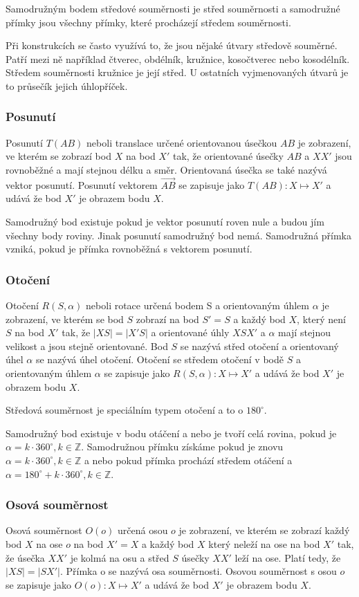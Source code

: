 \documentclass[12pt]{article}
\begin{document}
Samodružným bodem středové souměrnosti je střed souměrnosti a samodružné přímky jsou všechny
přímky, které procházejí středem souměrnosti.

Při konstrukcích se často využívá to, že jsou nějaké útvary středově souměrné. Patří mezi ně
například čtverec, obdélník, kružnice, kosočtverec nebo kosodélník. Středem souměrnosti kružnice je
její střed. U ostatních vyjmenovaných útvarů je to průsečík jejich úhlopříček.
\subsubsection*{Posunutí}
Posunutí $T(AB)$ neboli translace určené orientovanou úsečkou $AB$ je zobrazení, ve kterém se zobrazí
bod $X$ na bod $X'$ tak, že orientované úsečky $AB$ a $XX'$ jsou rovnoběžné a mají stejnou délku
a směr. Orientovaná úsečka se také nazývá vektor posunutí. Posunutí vektorem $\vec{AB}$ se zapisuje
jako $T(AB) : X \mapsto X'$ a udává že bod $X'$ je obrazem bodu $X$. 

Samodružný bod existuje pokud je vektor posunutí roven nule a budou jím všechny body roviny. Jinak
posunutí samodružný bod nemá. Samodružná přímka vzniká, pokud je přímka rovnoběžná s vektorem posunutí.
\subsubsection*{Otočení}
Otočení $R(S, \alpha)$ neboli rotace určená bodem S a orientovaným úhlem $\alpha$ je zobrazení, ve
kterém se bod $S$ zobrazí na bod $S' = S$ a každý bod $X$, který není $S$ na bod $X'$ tak, že
$|XS| = |X'S|$ a orientované úhly $XSX'$ a $\alpha$ mají stejnou velikost a jsou stejně orientované.
Bod $S$ se nazývá střed otočení a orientovaný úhel $\alpha$ se nazývá úhel otočení. Otočení se
středem otočení v bodě $S$ a orientovaným úhlem $\alpha$ se zapisuje jako $R(S, \alpha) : X \mapsto
X'$ a udává že bod $X'$ je obrazem bodu $X$.

Středová souměrnost je speciálním typem otočení a to o $180^\circ$.

Samodružný bod existuje v bodu otáčení a nebo je tvoří celá rovina, pokud je $\alpha = k \cdot
360^\circ, k \in \mathbb{Z}$. Samodružnou přímku získáme pokud je znovu $\alpha = k \cdot
360^\circ, k \in \mathbb{Z}$ a nebo pokud přímka prochází středem otáčení a $\alpha = 180^\circ + k
\cdot 360^\circ, k \in \mathbb{Z}$.
\subsubsection*{Osová souměrnost}
Osová souměrnost $O(o)$ určená osou $o$ je zobrazení, ve kterém se zobrazí každý bod $X$ na ose $o$
na bod $X' = X$ a každý bod $X$ který neleží na ose na bod $X'$ tak, že úsečka $XX'$ je kolmá na osu
a střed $S$ úsečky $XX'$ leží na ose. Platí tedy, že $|XS| = |SX'|$. Přímka o se nazývá osa
souměrnosti. Osovou souměrnost s osou $o$ se zapisuje jako $O(o) : X \mapsto X'$ a udává že bod $X'$
je obrazem bodu $X$.
\end{document}
